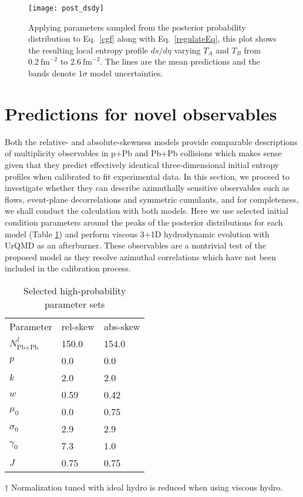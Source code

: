 \begin{figure}
  \texttt{[image: post\_dsdy]}
  \caption{Applying parameters sampled from the posterior probability distribution to Eq.~\eqref{cgf} along with Eq.~\eqref{regulateEq}, this plot shows the resulting local entropy profile $ds/d\eta$ varying $T_A$ and $T_B$ from $0.2~\text{fm}^{-2}$ to $2.6~\text{fm}^{-2}$. The lines are the mean predictions and the bands denote $1\sigma$ model uncertainties.
  }
  \label{fig:post_dsdy}
\end{figure}


\section{Predictions for novel observables}
Both the relative- and absolute-skewness models provide comparable descriptions of multiplicity observables in p+Pb and Pb+Pb collisions which makes sense given that they predict effectively identical three-dimensional initial entropy profiles when calibrated to fit experimental data.
In this section, we proceed to investigate whether they can describe azimuthally sensitive observables such as flows, event-plane decorrelations and symmetric cumulants, and for completeness, we shall conduct the calculation with both models.
Here we use selected initial condition parameters around the peaks of the posterior distributions for each model (Table \ref{tab:chosen_parameters}) and perform viscous 3+1D hydrodynamic evolution with UrQMD as an afterburner.
These observables are a nontrivial test of the proposed model as they resolve azimuthal correlations which have not been included in the calibration process.

\begin{table}[t]
  \caption{Selected high-probability parameter sets}
    \begin{tabular}{lll}
      Parameter & rel-skew	& abs-skew \\
      \paddedhline
      $N_{\textrm{Pb+Pb}}^\dagger$   & 150.0     & 154.0  \\
      $p$	    & 0.0      & 0.0  \\
      $k$	    & 2.0     & 2.0  \\
      $w$	    & 0.59     & 0.42  \\
      $\mu_0$   & 0.0     & 0.75  \\
      $\sigma_0$ & 2.9    & 2.9  \\
   	  $\gamma_0$ & 7.3		& 1.0	\\
      $J$	     & 0.75 & 0.75	\\
    \end{tabular}
  \raggedright{$\dagger$ Normalization tuned with ideal hydro is reduced when using viscous hydro.}
  \label{tab:chosen_parameters}
\end{table}

